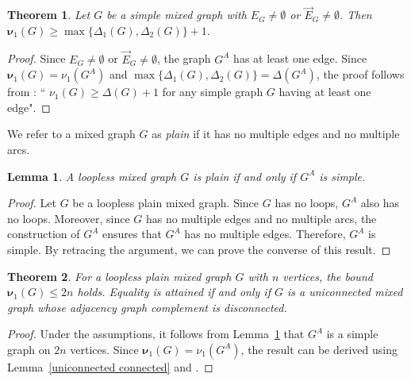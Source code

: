 \documentclass[12pt]{article}
\numberwithin{equation}{section}
\newtheorem{thm}{Theorem}[section]
\newtheorem{lemma}{Lemma}[section]
\begin{document}
	\begin{thm}
		Let $G$ be a simple mixed graph with $E_G\neq \emptyset$ or $\vec{E}_G\neq\emptyset$. Then $\bm{\nu}_1(G)\geq \max\{\Delta_1(G),\Delta_2(G)\}+1.$
	\end{thm}
	\begin{proof}
		Since $E_G\neq \emptyset$ or $\vec{E}_G\neq\emptyset$, the graph $G^A$ has at least one edge. Since $\bm{\nu}_1(G)=\nu_1(G^A)$ and $\max\{\Delta_1(G),\Delta_2(G)\}=\Delta(G^A)$, the proof follows from \cite[Theorem~4.12]{bapatbook}: `` $\nu_1(G)\geq\Delta(G)+1$ for any simple graph $G$ having at least one edge".
	\end{proof}
	We refer to a mixed graph $G$ as \textit{plain} if  it has no multiple edges and no multiple arcs. 
	\begin{lemma}\label{plainsimple}
		A loopless mixed graph $G$ is plain if and only if $G^A$ is simple.
	\end{lemma}
	\begin{proof}
		Let $G$ be a loopless plain mixed graph. Since $G$ has no loops, $G^A$ also has no loops. Moreover, since $G$ has no multiple edges and no multiple arcs, the construction of $G^A$ ensures that $G^A$ has no multiple edges. Therefore, $G^A$ is simple. By retracing the argument, we can prove the converse of this result.
	\end{proof}
	\begin{thm}
	For a loopless plain mixed graph $ G $ with $ n $ vertices, the bound $ \bm{\nu}_1(G) \leq 2n $ holds. Equality is attained if and only if $ G $ is a uniconnected mixed graph whose adjacency graph complement is disconnected.
	\end{thm}
	\begin{proof}
		Under the assumptions,  it follows from Lemma~\ref{plainsimple} that  $G^A$ is a simple graph on $2n$ vertices. Since $\bm{\nu}_1(G)=\nu_1(G^A)$,  the result can be derived using  Lemma~\ref{uniconnected connected} and \cite[Proposition~7.3.3]{cvetkovic}.
	\end{proof}
	
\end{document}
